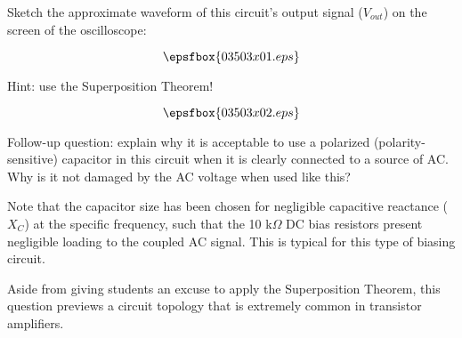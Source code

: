 

Sketch the approximate waveform of this circuit's output signal ($V_{out}$) on the screen of the oscilloscope:

$$\epsfbox{03503x01.eps}$$

Hint: use the Superposition Theorem!

\vskip 10pt







$$\epsfbox{03503x02.eps}$$

\vskip 10pt

Follow-up question: explain why it is acceptable to use a polarized (polarity-sensitive) capacitor in this circuit when it is clearly connected to a source of AC.  Why is it not damaged by the AC voltage when used like this?







Note that the capacitor size has been chosen for negligible capacitive reactance ($X_C$) at the specific frequency, such that the 10 k$\Omega$ DC bias resistors present negligible loading to the coupled AC signal.  This is typical for this type of biasing circuit.

Aside from giving students an excuse to apply the Superposition Theorem, this question previews a circuit topology that is extremely common in transistor amplifiers.




